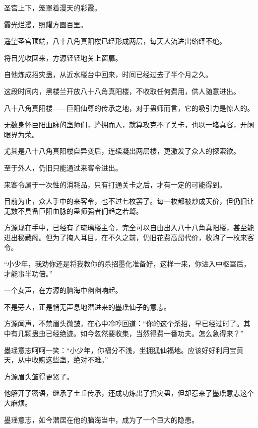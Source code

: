 
\begin{this_body}



圣宫上下，笼罩着漫天的彩霞。

霞光烂漫，照耀方圆百里。

遥望圣宫顶端，八十八角真阳楼已经形成两层，每天人流进出络绎不绝。

将目光收回来，方源轻轻地关上窗扉。

自他炼成招灾蛊，从近水楼台中回来，时间已经过去了半个月之久。

这段时间内，黑楼兰开放八十八角真阳楼，不收取任何费用，供人随意进出。

八十八角真阳楼——巨阳仙尊的传承之地，对于蛊师而言，它的吸引力是惊人的。

无数身怀巨阳血脉的蛊师们，蜂拥而入，就算攻克不了关卡，也以一堵真容，开阔眼界为荣。

尤其是八十八角真阳楼自异变后，连续凝出两层楼，更激发了众人的探索欲。

至于外人，仍旧只能通过来客令进出。

来客令属于一次性的消耗品，只有打通关卡之后，才有一定的可能得到。

目前为止，众人手中的来客令，也不过七枚罢了。每一枚都被炒成天价，但仍旧让无数不具备巨阳血脉的蛊师强者们趋之若鹜。

方源现在手中，已经有了琉璃楼主令，完全可以自由出入八十八角真阳楼，甚至能进出秘藏阁。但为了掩人耳目，在不久之前，仍旧花费高昂代价，收购了一枚来客令。

“小少年，我劝你还是将我教你的杀招墨化准备好，这样一来，你进入中枢室后，才能事半功倍。”

一个女声，在方源的脑海中幽幽响起。

不是旁人，正是悄无声息地潜进来的墨瑶仙子的意志。

方源闻声，不禁眉头微皱，在心中冷哼回道：“你的这个杀招，早已经过时了。其中有几颗蛊虫已经绝迹。如今忽然要收集，当然得费一番功夫。怎么急得来？”

墨瑶意志呵呵一笑：“小少年，你福分不浅，坐拥狐仙福地。应该好好利用宝黄天，从中收购这些蛊，绝对不难。”

方源眉头皱得更紧了。

他解开了密语，继承了土丘传承，还成功炼出了招灾蛊，但却惹来了墨瑶意志这个大麻烦。

墨瑶意志，如今潜居在他的脑海当中，成为了一个巨大的隐患。


\end{this_body}
